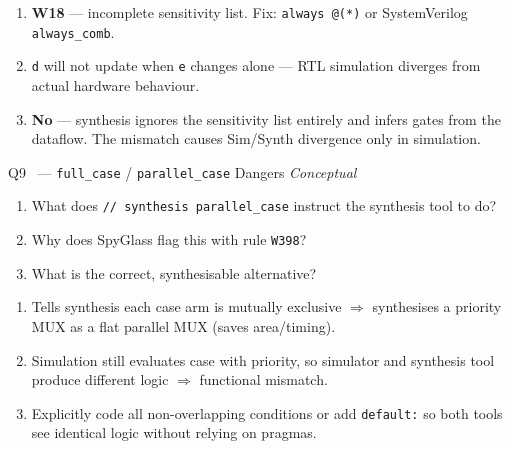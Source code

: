 \documentclass[12pt,a4paper]{article}
\newcommand{\moderate}{%
  \fbox{\textcolor{modoran}{\bfseries\sffamily\small MODERATE}}}
\begin{document}
\begin{answerbox}
\begin{enumerate}[label=\textbf{\alph*)}]
  \item \textbf{W18} --- incomplete sensitivity list. Fix: \texttt{always @(*)} or SystemVerilog \texttt{always\_comb}.
  \item \texttt{d} will not update when \texttt{e} changes alone --- RTL simulation diverges from actual hardware behaviour.
  \item \textbf{No} --- synthesis ignores the sensitivity list entirely and infers gates from the dataflow. The mismatch causes Sim/Synth divergence only in simulation.
\end{enumerate}
\end{answerbox}

\begin{questionbox}{Q9 \moderate\ --- \texttt{full\_case} / \texttt{parallel\_case} Dangers \hfill\textit{Conceptual}}
\begin{enumerate}[label=\textbf{\alph*)}]
  \item What does \texttt{// synthesis parallel\_case} instruct the synthesis tool to do?
  \item Why does SpyGlass flag this with rule \texttt{W398}?
  \item What is the correct, synthesisable alternative?
\end{enumerate}
\end{questionbox}

\begin{answerbox}
\begin{enumerate}[label=\textbf{\alph*)}]
  \item Tells synthesis each case arm is mutually exclusive $\Rightarrow$ synthesises a priority MUX as a flat parallel MUX (saves area/timing).
  \item Simulation still evaluates case with priority, so simulator and synthesis tool produce different logic $\Rightarrow$ functional mismatch.
  \item Explicitly code all non-overlapping conditions or add \texttt{default:} so both tools see identical logic without relying on pragmas.
\end{enumerate}
\end{answerbox}
\end{document}
